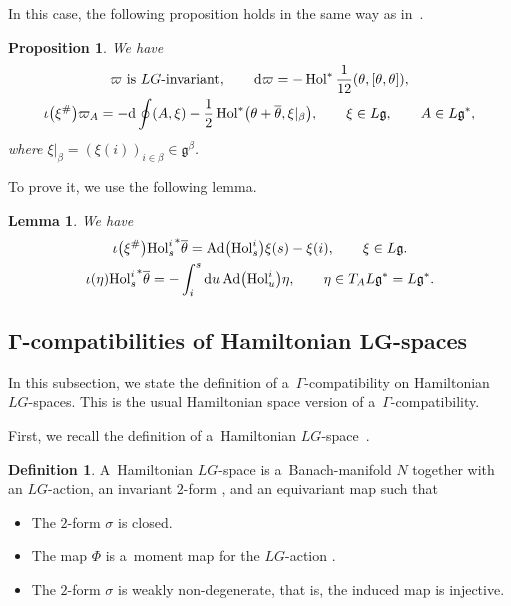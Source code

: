 \documentclass[pdftex]{sigma}
\numberwithin{equation}{section}
\newtheorem{Lemma}[Theorem]{Lemma}
\newtheorem{Proposition}[Theorem]{Proposition}
\theoremstyle{definition}
\newtheorem{Definition}[Theorem]{Definition}
\newcommand{\Ad}{\operatorname{Ad}}
\newcommand{\Hol}{\operatorname{Hol}}
\begin{document}
In this case, the following proposition holds in the same way as in~\cite[Proposition 8.1]{AMM}.

\begin{Proposition}\label{formula on loop group}We have
 \begin{gather*}
 \varpi\ \text{is}\ LG\text{-invariant}, \qquad
 {\rm d} \varpi = - \Hol ^{*}\frac{1}{12}(\theta,[\theta,\theta]), \\
 \iota\bigl(\xi^{\#}\bigr)\varpi_A = -{\rm d} \oint (A,\xi) - \frac{1}{2}\Hol^*\bigl(\theta + \overline{\theta}, \xi|_\beta\bigr), \qquad \xi \in L\mathfrak{g},\qquad A \in L\mathfrak{g}^*,
 \end{gather*}
 where $\xi|_{\beta} = (\xi(i))_{i \in \beta} \in \mathfrak{g}^{\beta}$.
\end{Proposition}

To prove it, we use the following lemma.

\begin{Lemma}\label{lemma of calc of Hol} We have
 \begin{gather*}
 \iota\bigl(\xi^{\#}\bigr){\Hol^{i}_s}^{*}\overline{\theta} = \Ad\bigl(\Hol^{i}_s\bigr)\xi(s) - \xi(i), \qquad \xi \in L\mathfrak{g}. \\
 \iota(\eta) {\Hol^{i}_s}^*\overline{\theta} = - \int_{i}^{s}{\rm d}u \Ad \bigl(\Hol^{i}_u\bigr)\eta , \qquad \eta \in T_A L\mathfrak{g}^{*}=L\mathfrak{g}^*.
 \end{gather*}
\end{Lemma}


\subsection[Gamma-compatibilities of Hamiltonian LG-spaces]{$\boldsymbol{\Gamma}$-compatibilities of Hamiltonian $\boldsymbol{LG}$-spaces}

In this subsection, we state the definition of a~$\Gamma$-compatibility on Hamiltonian $LG$-spaces.
This is the usual Hamiltonian space version of a~$\Gamma$-compatibility.

First, we recall the definition of a~Hamiltonian $LG$-space~\cite{AMM}.

\begin{Definition} A~Hamiltonian $LG$-space is a~Banach-manifold $N$ together with an $LG$-action, an invariant $2$-form , and an equivariant map  such that
 \begin{itemize}\itemsep=0pt
 \item [(1)] The $2$-form $\sigma$ is closed.
 \item [(2)] The map $\Phi$ is a~moment map for the $LG$-action .
 \item [(3)] The $2$-form $\sigma$ is weakly non-degenerate, that is, the induced map  is injective.
 \end{itemize}
\end{Definition}
\end{document}
